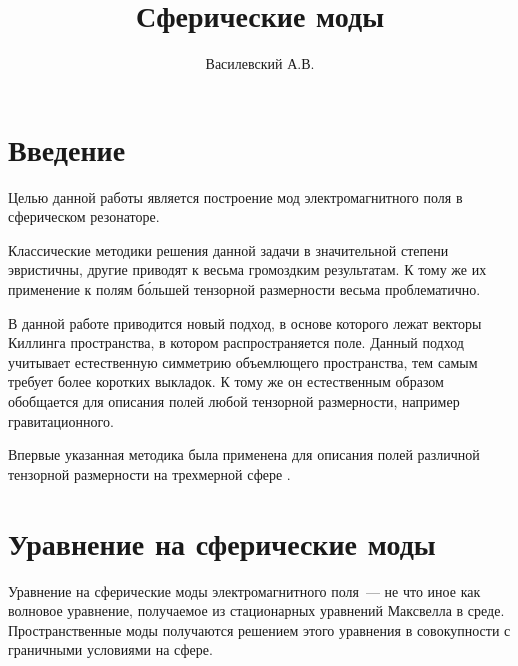 \documentclass[12pt,a4paper]{article}
\title{Сферические моды}
\author{Василевский А.В.}
\begin{document}
    \maketitle
    \tableofcontents


    \section*{Введение}

        Целью данной работы является построение мод электромагнитного поля в сферическом резонаторе.

        Классические методики решения данной задачи в значительной степени эвристичны, другие приводят к весьма громоздким результатам. К тому же их применение к полям б\'{о}льшей тензорной размерности весьма проблематично. \cite{burlankov_tmf}

        В данной работе приводится новый подход, в основе которого лежат векторы Киллинга пространства, в котором распространяется поле. Данный подход учитывает естественную симметрию объемлющего пространства, тем самым требует более коротких выкладок. К тому же он естественным образом обобщается для описания полей любой тензорной размерности, например гравитационного. \cite{burlankov_tmf}

        Впервые указанная методика была применена для описания полей различной тензорной размерности на трехмерной сфере \cite{burlankov_tmf}.


    \section{Уравнение на сферические моды}

        Уравнение на сферические моды электромагнитного поля~--- не что иное как волновое уравнение, получаемое из стационарных уравнений Максвелла в среде. Пространственные моды получаются решением этого уравнения в совокупности с граничными условиями на сфере.
\end{document}
